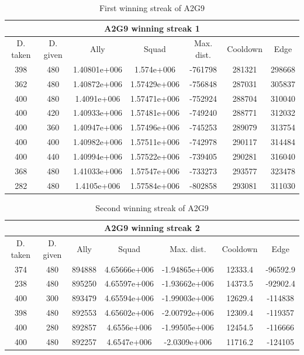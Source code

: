 \begin{centering}
\begin{table}

 \begin{tabular}{|c|c|c|c|c|c|c|}
	\multicolumn{7}{c}{A2G9 winning streak 1} \\
	\hline
	D. taken & D. given & Ally & Squad & Max. dist. & Cooldown & Edge \\
	\hline
		398&480& 1.40801e+006&1.574e+006&-761798&281321&298668\\
		362&480&1.40872e+006&1.57429e+006&-756848&287031&305837\\
		400&480&1.4091e+006&1.57471e+006&-752924&288704&310040\\
		400&420&1.40933e+006&1.57481e+006&-749240&288771&312032\\
		400&360&1.40947e+006&1.57496e+006&-745253&289079&313754\\
		400&400&1.40982e+006&1.57511e+006&-742978&290117&314484\\
		400&440&1.40994e+006&1.57522e+006&-739405&290281&316040\\
		368&480&1.41033e+006&1.57547e+006&-733273&293577&323478\\
		282&480&1.4105e+006&1.57584e+006&-802858&293081&311030\\
	\hline
\end{tabular}

	\label{winning_streak_A2G9_1.1}
	\caption{First winning streak of A2G9}
\end{table}
\end{centering}

\newpage


\begin{centering}
\begin{table}
 \begin{tabular}{|c|c|c|c|c|c|c|}
	\multicolumn{7}{c}{A2G9 winning streak 2} \\
	\hline
	D. taken & D. given & Ally & Squad & Max. dist. & Cooldown & Edge \\
	\hline
			374&480&894888&4.65666e+006&-1.94865e+006&12333.4&-96592.9\\
			238&480&895250&4.65597e+006&-1.93662e+006&14373.5&-92902.4\\
			400&300&893479&4.65594e+006&-1.99003e+006&12629.4&-114838\\
			398&480&892553&4.65602e+006&-2.00792e+006&12309.4&-119357\\
			400&280&892857&4.6556e+006&-1.99505e+006&12454.5&-116666\\
			400&480&892257&4.6547e+006&-2.0309e+006&11716.2&-124105\\
	\hline
\end{tabular}
	\label{winning_streak_A2G9_1.2}
	\caption{Second winning streak of A2G9}
	\end{table}
\end{centering}